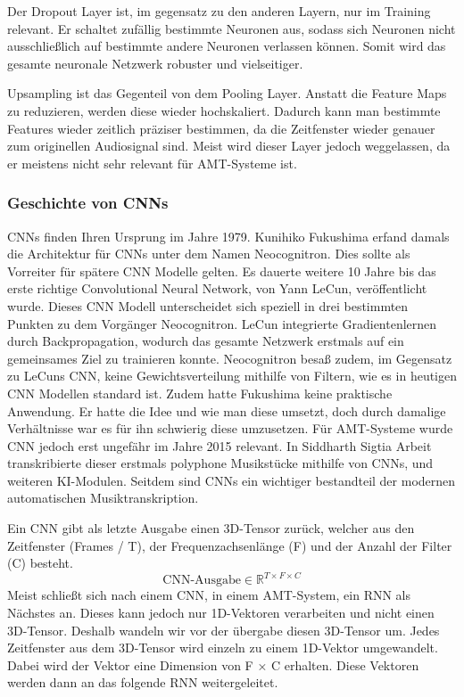 Der Dropout Layer ist, im gegensatz zu den anderen Layern, nur im Training relevant.
Er schaltet zufällig bestimmte Neuronen aus,
sodass sich Neuronen nicht ausschließlich auf bestimmte andere Neuronen verlassen können.
Somit wird das gesamte neuronale Netzwerk robuster und vielseitiger.

Upsampling ist das Gegenteil von dem Pooling Layer.
Anstatt die Feature Maps zu reduzieren, werden diese wieder hochskaliert.
Dadurch kann man bestimmte Features wieder zeitlich präziser bestimmen,
da die Zeitfenster wieder genauer zum originellen Audiosignal sind.
Meist wird dieser Layer jedoch weggelassen, da er meistens nicht sehr relevant für AMT-Systeme ist.

\subsubsection{Geschichte von CNNs}
CNNs finden Ihren Ursprung im Jahre 1979.
Kunihiko Fukushima erfand damals die Architektur für CNNs unter dem Namen Neocognitron.
\cite{fukushima1980neocognitron}
Dies sollte als Vorreiter für spätere CNN Modelle gelten.
Es dauerte weitere 10 Jahre bis das erste richtige Convolutional Neural Network, von Yann LeCun, veröffentlicht wurde.
\cite{lecun1989backpropagation}
Dieses CNN Modell unterscheidet sich speziell in drei bestimmten Punkten zu dem Vorgänger Neocognitron.
LeCun integrierte Gradientenlernen durch Backpropagation,
wodurch das gesamte Netzwerk erstmals auf ein gemeinsames Ziel zu trainieren konnte.
Neocognitron besaß zudem, im Gegensatz zu LeCuns CNN,
keine Gewichtsverteilung mithilfe von Filtern, wie es in heutigen CNN Modellen standard ist.
Zudem hatte Fukushima keine praktische Anwendung.
Er hatte die Idee und wie man diese umsetzt, doch durch damalige Verhältnisse war es für ihn schwierig diese umzusetzen.
Für AMT-Systeme wurde CNN jedoch erst ungefähr im Jahre 2015 relevant.
\cite{sigtia2016end}
In Siddharth Sigtia Arbeit transkribierte dieser
erstmals polyphone Musikstücke mithilfe von CNNs, und weiteren KI-Modulen.
Seitdem sind CNNs ein wichtiger bestandteil der modernen automatischen Musiktranskription.

Ein CNN gibt als letzte Ausgabe einen 3D-Tensor zurück,
welcher aus den Zeitfenster (Frames / T), der Frequenzachsenlänge (F) und der Anzahl der Filter (C) besteht.
\[
\text{CNN-Ausgabe} \in \mathbb{R}^{T \times F \times C}
\]
Meist schließt sich nach einem CNN, in einem AMT-System, ein RNN als Nächstes an.
Dieses kann jedoch nur 1D-Vektoren verarbeiten und nicht einen 3D-Tensor.
Deshalb wandeln wir vor der übergabe diesen 3D-Tensor um.
Jedes Zeitfenster aus dem 3D-Tensor wird einzeln zu einem 1D-Vektor umgewandelt.
Dabei wird der Vektor eine Dimension von F × C erhalten.
Diese Vektoren werden dann an das folgende RNN weitergeleitet.

